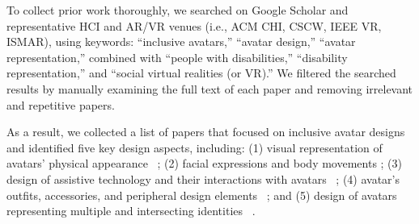 
To collect prior work thoroughly, we searched on Google Scholar and representative HCI and AR/VR venues (i.e., ACM CHI, CSCW, IEEE VR, ISMAR), using keywords: ``inclusive avatars,'' ``avatar design,'' ``avatar representation,'' combined with ``people with disabilities,'' ``disability representation,'' and ``social virtual realities (or VR).'' We filtered the searched results by manually examining the full text of each paper and removing irrelevant and repetitive papers. 

As a result, we collected a list of  papers that focused on inclusive avatar designs and identified five key design aspects, including: (1) visual representation of avatars' physical appearance ~\cite{zhang2022, kelly2023, Freeman2020, DavisStanovsek2021, Lee2014, lee_2021, McArthur_2015, McArthur2014, do2023valid, Weidner_2023, Morris_2023_women};
(2) facial expressions and body movements ;
(3) design of assistive technology and their interactions with avatars ~\cite{zhang2022, ParkKim2022, zhang2023, isit_assets24};
(4) avatar's outfits, accessories, and peripheral design elements ~\cite{zhang2022, zhang2023, DavisStanovsek2021};
and (5) design of avatars representing multiple and intersecting identities ~\cite{kelly2023}.

